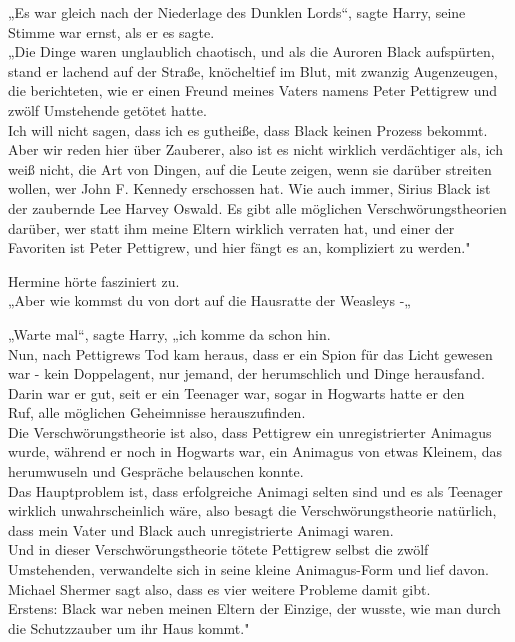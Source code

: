 {„Es war gleich nach der Niederlage des Dunklen Lords“, sagte Harry, seine Stimme war ernst, als er es sagte.\\ „Die Dinge waren unglaublich chaotisch, und als die Auroren Black aufspürten, stand er lachend auf der Straße, knöcheltief im Blut, mit zwanzig Augenzeugen, die berichteten, wie er einen Freund meines Vaters namens Peter Pettigrew und zwölf Umstehende getötet hatte.\\ Ich will nicht sagen, dass ich es gutheiße, dass Black keinen Prozess bekommt. Aber wir reden hier über Zauberer, also ist es nicht wirklich verdächtiger als, ich weiß nicht, die Art von Dingen, auf die Leute zeigen, wenn sie darüber streiten wollen, wer John F. Kennedy erschossen hat. Wie auch immer, Sirius Black ist der zaubernde Lee Harvey Oswald. Es gibt alle möglichen Verschwörungstheorien darüber, wer statt ihm meine Eltern wirklich verraten hat, und einer der Favoriten ist Peter Pettigrew, und hier fängt es an, kompliziert zu werden."

Hermine hörte fasziniert zu.\\ „Aber wie kommst du von dort auf die Hausratte der Weasleys -„

„Warte mal“, sagte Harry, „ich komme da schon hin.\\ Nun, nach Pettigrews Tod kam heraus, dass er ein Spion für das Licht gewesen war - kein Doppelagent, nur jemand, der herumschlich und Dinge herausfand.\\ Darin war er gut, seit er ein Teenager war, sogar in Hogwarts hatte er den\\ Ruf, alle möglichen Geheimnisse herauszufinden.\\ Die Verschwörungstheorie ist also, dass Pettigrew ein unregistrierter Animagus wurde, während er noch in Hogwarts war, ein Animagus von etwas Kleinem, das herumwuseln und Gespräche belauschen konnte.\\ Das Hauptproblem ist, dass erfolgreiche Animagi selten sind und es als Teenager wirklich unwahrscheinlich wäre, also besagt die Verschwörungstheorie natürlich, dass mein Vater und Black auch unregistrierte Animagi waren.\\ Und in dieser Verschwörungstheorie tötete Pettigrew selbst die zwölf Umstehenden, verwandelte sich in seine kleine Animagus-Form und lief davon.\\ Michael Shermer sagt also, dass es vier weitere Probleme damit gibt.\\ Erstens: Black war neben meinen Eltern der Einzige, der wusste, wie man durch die Schutzzauber um ihr Haus kommt."

}
